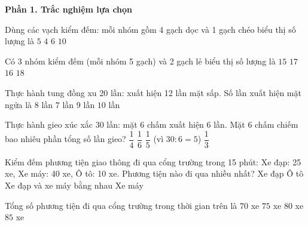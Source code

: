 \textbf{Phần 1. Trắc nghiệm lựa chọn}

\begin{ex} %
Dùng các vạch kiểm đếm: mỗi nhóm gồm 4 gạch dọc và 1 gạch chéo biểu thị số lượng là
\choice
{\True $5$}
{$4$}
{$6$}
{$10$}
\end{ex}

\begin{ex} %
Có 3 nhóm kiểm đếm (mỗi nhóm 5 gạch) và 2 gạch lẻ biểu thị số lượng là
\choice
{$15$}
{\True $17$}
{$16$}
{$18$}
\end{ex}

\begin{ex} %
Thực hành tung đồng xu 20 lần: xuất hiện 12 lần mặt sấp. Số lần xuất hiện mặt ngửa là
\choice
{\True $8$ lần}
{$7$ lần}
{$9$ lần}
{$10$ lần}
\end{ex}

\begin{ex} %
Thực hành gieo xúc xắc 30 lần: mặt 6 chấm xuất hiện 6 lần. Mặt 6 chấm chiếm bao nhiêu phần tổng số lần gieo?
\choice
{$\dfrac{1}{4}$}
{$\dfrac{1}{6}$}
{\True $\dfrac{1}{5}$ (vì $30 : 6 = 5$)}
{$\dfrac{1}{3}$}
\end{ex}

\begin{ex} %
Kiểm đếm phương tiện giao thông đi qua cổng trường trong 15 phút: Xe đạp: 25 xe, Xe máy: 40 xe, Ô tô: 10 xe. Phương tiện nào đi qua nhiều nhất?
\choice
{Xe đạp}
{Ô tô}
{Xe đạp và xe máy bằng nhau}
{\True Xe máy}
\end{ex}

\begin{ex} %
Tổng số phương tiện đi qua cổng trường trong thời gian trên là
\choice
{$70$ xe}
{\True $75$ xe}
{$80$ xe}
{$85$ xe}
\end{ex}

